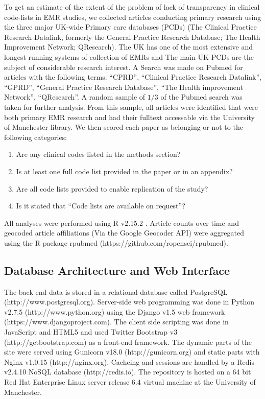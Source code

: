 \documentclass[10pt]{article}
\begin{document}
To get an estimate of the extent of the problem of lack of transparency in clinical code-lists in EMR studies, we collected articles conducting primary research using the three major UK-wide Primary care databases (PCDs) (The Clinical Practice Research Datalink, formerly the General Practice Research Database; The Health Improvement Network; QResearch).  The UK has one of the most extensive and longest running systems of collection of EMRs and The main UK PCDs are the subject of considerable research interest.  A Search was made on Pubmed for articles with the following terms: ``CPRD'', ``Clinical Practice Research Datalink'', ``GPRD'', ``General Practice Research Database'', ``The Health improvement Network'', ``QResearch''.  A random sample of $1/3$ of the Pubmed search was taken for further analysis.  From this sample, all articles were identified that were both primary EMR research and had their fulltext accessable via the University of Manchester library. We then scored each paper as belonging or not to the following categories:

\begin{enumerate}
    \item Are any clinical codes listed in the methods section?
    \item Is at least one full code list provided in the paper or in an appendix?
    \item Are all code lists provided to enable replication of the study?
    \item Is it stated that ``Code lists are available on request''? 
\end{enumerate}

All analyses were performed using R v2.15.2 \cite{R2012}. Article counts over time and geocoded article affiliations (Via the Google Geocoder API) were aggregated using the R package rpubmed (https://github.com\slash ropensci/rpubmed).

\subsection*{Database Architecture and Web Interface}

The back end data is stored in a relational database called PostgreSQL (http://www.postgresql.org). Server-side web programming was done in Python v2.7.5 (http://www.python.org) using the Django v1.5 web framework (https://www.djangoproject.com). The client side scripting was done in JavaScript and HTML5 and used Twitter Bootstrap v3 (http://getbootstrap.com) as a front-end framework.  The dynamic parts of the site were served using Gunicorn v18.0 (http://gunicorn.org) and static parts with Nginx v1.0.15 (http://nginx.org). Cacheing and sessions are handled by a Redis v2.4.10 NoSQL database (http://redis.io). The repository is hosted on a 64 bit Red Hat Enterprise Linux server release 6.4 virtual machine  at the University of Manchester. 
\end{document}
